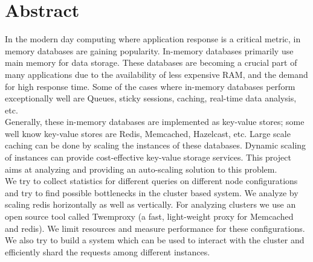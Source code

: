 \documentclass[11pt]{article}
\begin{document}

\section*{Abstract}
In the modern day computing where application response is a 
critical metric, in memory databases are gaining popularity. In-memory 
databases primarily use main memory for data storage. These databases 
are becoming a crucial part of many applications due to the availability 
of less expensive RAM, and the demand for high response time.  Some of 
the cases where in-memory databases perform exceptionally well are 
Queues, sticky sessions, caching, real-time data analysis, etc.
\\

Generally, these in-memory databases are implemented as key-value 
stores; some well know key-value stores are Redis, Memcached, Hazelcast, 
etc. Large scale caching can be done by scaling the instances of these 
databases. Dynamic scaling of instances can provide cost-effective 
key-value storage services. This project aims at analyzing and providing 
an auto-scaling solution to this problem.
\\

We try to collect statistics for different queries on different node 
configurations and try to find possible bottlenecks in the cluster based 
system. We analyze by scaling redis horizontally as well as vertically. 
For analyzing clusters we use an open source tool called Twemproxy (a 
fast, light-weight proxy for Memcached and redis). We limit resources 
and measure performance for these configurations. We also try to build a 
system which can be used to interact with the cluster and efficiently 
shard the requests among different instances.
\end{document}
